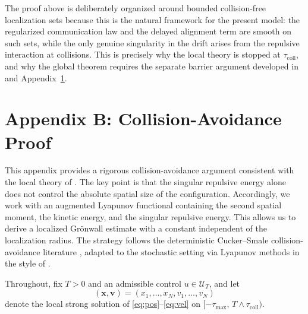 \documentclass[pdflatex,sn-mathphys-num]{sn-jnl}%
\numberwithin{equation}{section}
\theoremstyle{thmstyleone}%
\theoremstyle{remark}
\theoremstyle{definition}
\newcommand{\calU}{\mathcal{U}}
\begin{document}
The proof above is deliberately organized around bounded collision-free
localization sets because this is the natural framework for the present
model: the regularized communication law and the delayed alignment term
are smooth on such sets, while the only genuine singularity in the drift
arises from the repulsive interaction at collisions. This is precisely why
the local theory is stopped at $\tau_{\mathrm{coll}}$, and why the global
theorem requires the separate barrier argument developed in
 and Appendix~\ref{app:collision-proof}.
\section{Appendix B: Collision-Avoidance Proof}
\label{app:collision-proof}
This appendix provides a rigorous collision-avoidance argument consistent
with the local theory of . The key point is that the
singular repulsive energy alone does not control the absolute spatial size
of the configuration. Accordingly, we work with an augmented Lyapunov
functional containing the second spatial moment, the kinetic energy, and
the singular repulsive energy. This allows us to derive a localized
Gr\"onwall estimate with a constant independent of the localization
radius. The strategy follows the deterministic Cucker--Smale
collision-avoidance literature
\cite{cucker2010avoiding,park2010cucker,carrillo2017sharp}, adapted to
the stochastic setting via Lyapunov methods in the style of
\cite{khasminskii2011stochastic,mao2007stochastic}.

Throughout, fix $T>0$ and an admissible control $u\in\calU_T$, and let
\[
  (\mathbf{x},\mathbf{v})=
  (x_1,\dots,x_N,v_1,\dots,v_N)
\]
denote the local strong solution of \eqref{eq:pos}--\eqref{eq:vel} on
$[-\tau_{\max},\,T\wedge\tau_{\mathrm{coll}})$.
\end{document}
